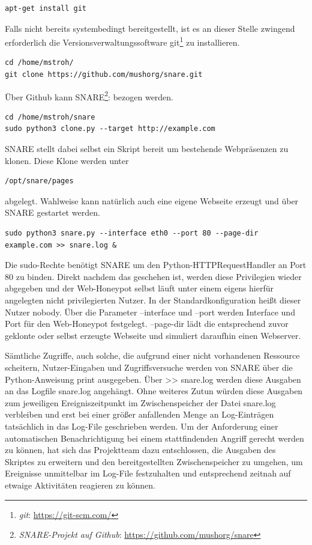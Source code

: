 \begin{lstlisting}[style=customc]
apt-get install git
\end{lstlisting}

Falls nicht bereits systembedingt bereitgestellt, ist es an dieser Stelle zwingend erforderlich die Versionsverwaltungssoftware git\footnote{ \textit{git}: \url{https://git-scm.com/}} zu installieren.

\begin{lstlisting}[style=customc]
cd /home/mstroh/
git clone https://github.com/mushorg/snare.git
\end{lstlisting}

Über Github kann SNARE\footnote{ \textit{SNARE-Projekt auf Github}: \url{https://github.com/mushorg/snare}}: bezogen werden.

\begin{lstlisting}[style=customc]
cd /home/mstroh/snare
sudo python3 clone.py --target http://example.com
\end{lstlisting}

SNARE stellt dabei selbst ein Skript bereit um bestehende Webpräsenzen zu klonen. Diese Klone werden unter
\begin{lstlisting}[style=customc]
/opt/snare/pages
\end{lstlisting}
abgelegt. Wahlweise kann natürlich auch eine eigene Webseite erzeugt und über SNARE gestartet werden.

\begin{lstlisting}[style=customc]
sudo python3 snare.py --interface eth0 --port 80 --page-dir example.com >> snare.log &
\end{lstlisting}
Die sudo-Rechte benötigt SNARE um den Python-HTTPRequestHandler an Port 80 zu binden. Direkt nachdem das geschehen ist, werden diese Privilegien wieder abgegeben und der Web-Honeypot selbst läuft unter einem eigens hierfür angelegten nicht privilegierten Nutzer. In der Standardkonfiguration heißt dieser Nutzer nobody. Über die Parameter \grqq{}--interface\grqq{} und \grqq{}--port\grqq{} werden Interface und Port für den Web-Honeypot festgelegt. \grqq{}--page-dir\grqq{} lädt die entsprechend zuvor geklonte oder selbst erzeugte Webseite und simuliert daraufhin einen Webserver. 

Sämtliche Zugriffe, auch solche, die aufgrund einer nicht vorhandenen Ressource scheitern, Nutzer-Eingaben und Zugriffsversuche werden von SNARE über die Python-Anweisung print ausgegeben. Über \grqq{}>> snare.log\grqq{} werden diese Ausgaben an das Logfile \grqq{}snare.log\grqq{} angehängt.  Ohne weiteres Zutun würden diese Ausgaben zum jeweiligen Ereigniszeitpunkt im Zwischenspeicher der Datei \grqq{}snare.log\grqq{} verbleiben und erst bei einer größer anfallenden Menge an Log-Einträgen tatsächlich in das Log-File geschrieben werden. Um der Anforderung einer automatischen Benachrichtigung bei einem stattfindenden Angriff gerecht werden zu können, hat sich das Projektteam dazu entschlossen, die Ausgaben des Skriptes zu erweitern und den bereitgestellten Zwischenspeicher zu umgehen, um Ereignisse unmittelbar im Log-File festzuhalten und entsprechend zeitnah auf etwaige Aktivitäten reagieren zu können. 

